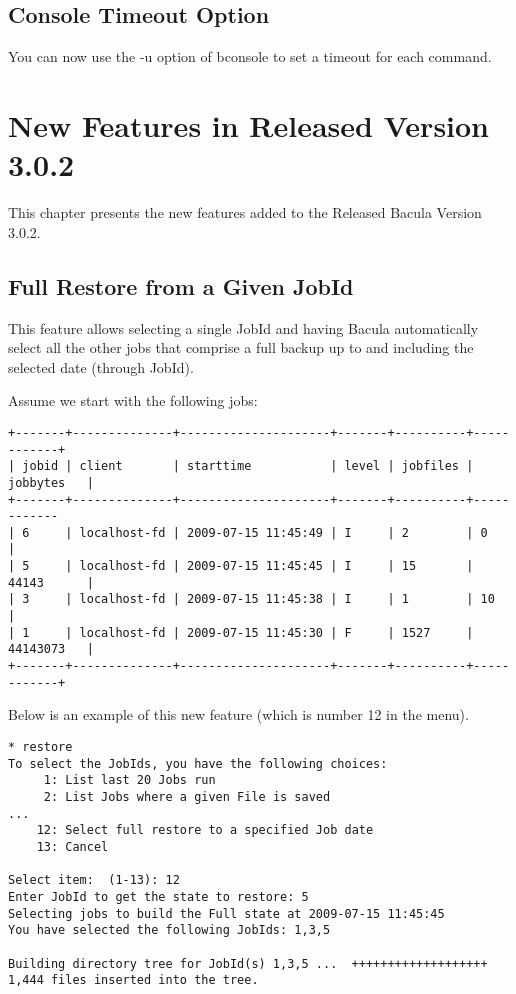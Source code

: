 \section{Console Timeout Option}
You can now use the -u option of bconsole to set a timeout for each command.

\chapter{New Features in Released Version 3.0.2}

This chapter presents the new features added to the
Released Bacula Version 3.0.2.

\section{Full Restore from a Given JobId}

This feature allows selecting a single JobId and having Bacula
automatically select all the other jobs that comprise a full backup up to
and including the selected date (through JobId).

Assume we start with the following jobs:
\begin{verbatim}
+-------+--------------+---------------------+-------+----------+------------+
| jobid | client       | starttime           | level | jobfiles | jobbytes   |
+-------+--------------+---------------------+-------+----------+------------
| 6     | localhost-fd | 2009-07-15 11:45:49 | I     | 2        | 0          |
| 5     | localhost-fd | 2009-07-15 11:45:45 | I     | 15       | 44143      |
| 3     | localhost-fd | 2009-07-15 11:45:38 | I     | 1        | 10         |
| 1     | localhost-fd | 2009-07-15 11:45:30 | F     | 1527     | 44143073   |
+-------+--------------+---------------------+-------+----------+------------+
\end{verbatim}

Below is an example of this new feature (which is number 12 in the
menu).

\begin{verbatim}
* restore
To select the JobIds, you have the following choices:
     1: List last 20 Jobs run
     2: List Jobs where a given File is saved
...
    12: Select full restore to a specified Job date
    13: Cancel

Select item:  (1-13): 12
Enter JobId to get the state to restore: 5
Selecting jobs to build the Full state at 2009-07-15 11:45:45
You have selected the following JobIds: 1,3,5

Building directory tree for JobId(s) 1,3,5 ...  +++++++++++++++++++
1,444 files inserted into the tree.
\end{verbatim}

